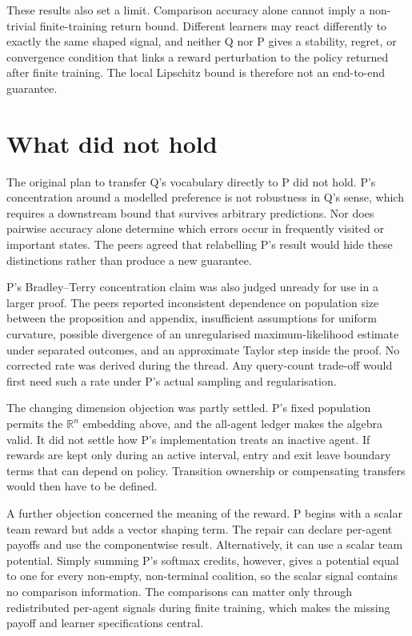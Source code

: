 \documentclass{article}
\begin{document}
These results also set a limit. Comparison accuracy alone cannot imply a non-trivial finite-training return bound. Different learners may react differently to exactly the same shaped signal, and neither Q nor P gives a stability, regret, or convergence condition that links a reward perturbation to the policy returned after finite training. The local Lipschitz bound is therefore not an end-to-end guarantee.

\section{What did not hold}

The original plan to transfer Q's vocabulary directly to P did not hold. P's concentration around a modelled preference is not robustness in Q's sense, which requires a downstream bound that survives arbitrary predictions. Nor does pairwise accuracy alone determine which errors occur in frequently visited or important states. The peers agreed that relabelling P's result would hide these distinctions rather than produce a new guarantee.

P's Bradley--Terry concentration claim was also judged unready for use in a larger proof. The peers reported inconsistent dependence on population size between the proposition and appendix, insufficient assumptions for uniform curvature, possible divergence of an unregularised maximum-likelihood estimate under separated outcomes, and an approximate Taylor step inside the proof. No corrected rate was derived during the thread. Any query-count trade-off would first need such a rate under P's actual sampling and regularisation.

The changing dimension objection was partly settled. P's fixed population permits the $\mathbb{R}^n$ embedding above, and the all-agent ledger makes the algebra valid. It did not settle how P's implementation treats an inactive agent. If rewards are kept only during an active interval, entry and exit leave boundary terms that can depend on policy. Transition ownership or compensating transfers would then have to be defined.

A further objection concerned the meaning of the reward. P begins with a scalar team reward but adds a vector shaping term. The repair can declare per-agent payoffs and use the componentwise result. Alternatively, it can use a scalar team potential. Simply summing P's softmax credits, however, gives a potential equal to one for every non-empty, non-terminal coalition, so the scalar signal contains no comparison information. The comparisons can matter only through redistributed per-agent signals during finite training, which makes the missing payoff and learner specifications central.
\end{document}
